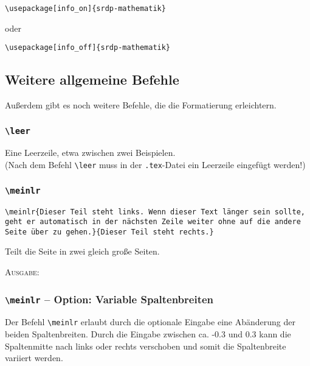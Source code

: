 \documentclass[a4paper,12pt]{article}
\begin{document}
\begin{verbatim}
\usepackage[info_on]{srdp-mathematik}
\end{verbatim}

oder

\begin{verbatim}
\usepackage[info_off]{srdp-mathematik}
\end{verbatim}

				
\subsection{Weitere allgemeine Befehle}
Außerdem gibt es noch weitere Befehle, die die Formatierung erleichtern. 

\subsubsection{\texttt{\textbackslash leer}}
Eine Leerzeile, etwa zwischen zwei Beispielen. \\
(Nach dem Befehl \texttt{\textbackslash leer} muss in der \texttt{.tex}-Datei ein Leerzeile eingefügt werden!) 

\leer

\subsubsection{\texttt{\textbackslash meinlr}}
\begin{verbatim}
\meinlr{Dieser Teil steht links. Wenn dieser Text länger sein sollte, 
geht er automatisch in der nächsten Zeile weiter ohne auf die andere 
Seite über zu gehen.}{Dieser Teil steht rechts.}
\end{verbatim}
Teilt die Seite in zwei gleich große Seiten. 

\leer

\textsc{Ausgabe:}



\subsubsection*{\texttt{\textbackslash meinlr} -- Option: Variable Spaltenbreiten}

Der Befehl \texttt{\textbackslash meinlr} erlaubt durch die optionale Eingabe eine Abänderung der beiden Spaltenbreiten. Durch die Eingabe zwischen ca. -0.3 und 0.3 kann die Spaltenmitte nach links oder rechts verschoben und somit die Spaltenbreite variiert werden.
\end{document}
